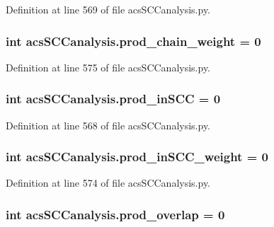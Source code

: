 Definition at line 569 of file acs\-S\-C\-Canalysis.\-py.

\hypertarget{a00102_a6736365f1f19058f6e1d57287383dbcc}{
\subsubsection[{prod\-\_\-chain\-\_\-weight}]{\setlength{\rightskip}{0pt plus 5cm}int acs\-S\-C\-Canalysis.\-prod\-\_\-chain\-\_\-weight = 0}}\label{a00102_a6736365f1f19058f6e1d57287383dbcc}


Definition at line 575 of file acs\-S\-C\-Canalysis.\-py.

\hypertarget{a00102_adbc76b0558ceb74d798b35146a583474}{
\subsubsection[{prod\-\_\-in\-S\-C\-C}]{\setlength{\rightskip}{0pt plus 5cm}int acs\-S\-C\-Canalysis.\-prod\-\_\-in\-S\-C\-C = 0}}\label{a00102_adbc76b0558ceb74d798b35146a583474}


Definition at line 568 of file acs\-S\-C\-Canalysis.\-py.

\hypertarget{a00102_aa22adccedd9ae548d0687df507ebd92d}{
\subsubsection[{prod\-\_\-in\-S\-C\-C\-\_\-weight}]{\setlength{\rightskip}{0pt plus 5cm}int acs\-S\-C\-Canalysis.\-prod\-\_\-in\-S\-C\-C\-\_\-weight = 0}}\label{a00102_aa22adccedd9ae548d0687df507ebd92d}


Definition at line 574 of file acs\-S\-C\-Canalysis.\-py.

\hypertarget{a00102_a213e964195f0666d00663ca874a09caa}{
\subsubsection[{prod\-\_\-overlap}]{\setlength{\rightskip}{0pt plus 5cm}int acs\-S\-C\-Canalysis.\-prod\-\_\-overlap = 0}}\label{a00102_a213e964195f0666d00663ca874a09caa}


